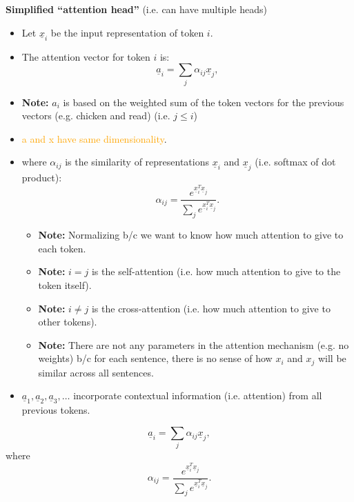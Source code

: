 \begin{definition}
    \textbf{Simplified ``attention head''} (i.e. can have multiple heads)
    \begin{itemize}
        \item Let $\underline{x}_i$ be the input representation of token $i$.
        \item The attention vector for token $i$ is:
        \[
        \underline{a}_i = \sum_j \alpha_{ij} \underline{x}_j,
        \]
        
        \item \textbf{Note:} $a_i$ is based on the weighted sum of the token vectors for the previous vectors (e.g. chicken and read) (i.e. $j \leq i$)
        \item \textcolor{orange}{a and x have same dimensionality}.
        \item where $\alpha_{ij}$ is the similarity of representations $\underline{x}_i$ and $\underline{x}_j$ (i.e. softmax of dot product):
        \[
        \alpha_{ij} = \frac{e^{\underline{x}_i^T \underline{x}_j}}{\sum_{j} e^{\underline{x}_i^T \underline{x}_j}}.
        \]
        \begin{itemize}
            \item \textbf{Note:} Normalizing b/c we want to know how much attention to give to each token.
            \item \textbf{Note:} $i=j$ is the self-attention (i.e. how much attention to give to the token itself).
            \item \textbf{Note:} $i \neq j$ is the cross-attention (i.e. how much attention to give to other tokens).
            \item \textbf{Note:} There are not any parameters in the attention mechanism (e.g. no weights) b/c for each sentence, there is no sense of how $x_i$ and $x_j$ will be similar across all sentences.
        \end{itemize}
        \item $\underline{a}_1, \underline{a}_2, \underline{a}_3, \dots$ incorporate contextual information (i.e. attention) from all previous tokens.
    \end{itemize}
    \vspace{1em}

    \[
    \underline{a}_i = \sum_j \alpha_{ij} \underline{x}_j,
    \]
    where
    \[
    \alpha_{ij} = \frac{e^{\underline{x}_i^T \underline{x}_j}}{\sum_{j} e^{\underline{x}_i^T \underline{x}_j}}.
    \]
\end{definition}

